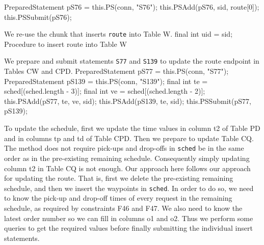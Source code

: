 \documentclass{article}
\def\nwendcode{\endtrivlist \endgroup}      %
\let\nwdocspar=\par
\theoremstyle{definition}                   %
\begin{document}
PreparedStatement pS76 = this.PS(conn, "S76");
this.PSAdd(pS76, sid, route[0]);
this.PSSubmit(pS76);
\nwendcode{}\nwdocspar
{\small We re-use the chunk that inserts {\tt{}route} into Table W.}
\nwenddocs{}\endmoddef{}
final int uid = sid;
\LA{}Procedure to insert \code{}route\edoc{} into Table W~{\nwtagstyle{}}\RA{}
\nwendcode{}\nwdocspar
{\small We prepare and submit statements {\tt{}\protect{}\protect{}S77} and {\tt{}\protect{}S139} to update the
route endpoint in Tables CW and CPD.}
\nwenddocs{}\endmoddef{}
PreparedStatement pS77 = this.PS(conn, "S77");
PreparedStatement pS139 = this.PS(conn, "S139");
final int te = sched[(sched.length - 3)];
final int ve = sched[(sched.length - 2)];
this.PSAdd(pS77, te, ve, sid);
this.PSAdd(pS139, te, sid);
this.PSSubmit(pS77, pS139);
\nwendcode{}\nwdocspar
{\small To update the schedule, first we update the time values in column
\textsf{t2} of Table PD and in columns \textsf{tp} and \textsf{td} of Table
CPD. Then we prepare to update Table CQ. The method does not require
pick-ups and drop-offs in {\tt{}sched} be in the same order as in the pre-existing
remaining schedule. Consequently simply updating column \textsf{t2} in Table CQ
is not enough. Our approach here follows our approach for
updating the route. That is, first we delete the pre-existing remaining
schedule, and then we insert the waypoints in {\tt{}sched}. In order to do so, we
need to know the pick-up and drop-off times of every request in the remaining
schedule, as required by constraints F46 and F47. We also need to know the
latest order number so we can fill in columns \textsf{o1} and \textsf{o2}. Thus
we perform some queries to get the required values before finally submitting
the individual insert statements.}
\end{document}
